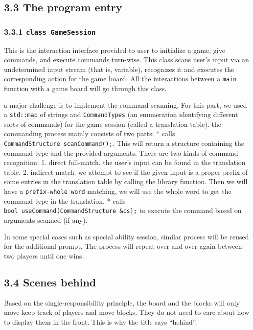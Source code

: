 \documentclass[
]{article}
\begin{document}
\hypertarget{the-program-entry}{%
\subsection{3.3 The program entry}\label{the-program-entry}}

\hypertarget{class-gamesession}{%
\subsubsection{\texorpdfstring{3.3.1
\texttt{class\ GameSession}}{3.3.1 class GameSession}}\label{class-gamesession}}

This is the interaction interface provided to user to initialize a game,
give commands, and execute commands turn-wise. This class scans user's
input via an undetermined input stream (that is, variable), recognizes
it and executes the corresponding action for the game board. All the
interactions between a \texttt{main} function with a game board will go
through this class.

a major challenge is to implement the command scanning. For this part,
we used a \texttt{std::map} of strings and \texttt{CommandTypes} (an
enumeration identifying different sorts of commands) for the game
session (called a translation table). the commanding process mainly
consists of two parts: * calls
\texttt{CommandStructure\ scanCommand();}. This will return a structure
containing the command type and the provided arguments. There are two
kinds of command-recognition: 1. direct full-match. the user's input can
be found in the translation table. 2. indirect match. we attempt to see
if the given input is a proper prefix of some entries in the translation
table by calling the library function. Then we will have a
\texttt{prefix-whole\ word} matching, we will use the whole word to get
the command type in the translation. * calls
\texttt{bool\ useCommand(CommandStructure\ \&cs);} to execute the
command based on arguments scanned (if any).

In some special cases such as special ability session, similar process
will be reused for the additional prompt. The process will repeat over
and over again between two players until one wins.

\hypertarget{scenes-behind}{%
\subsection{3.4 Scenes behind}\label{scenes-behind}}

Based on the single-responsibility principle, the board and the blocks
will only move keep track of players and move blocks. They do not need
to care about how to display them in the front. This is why the title
says ``hehind''.
\end{document}
